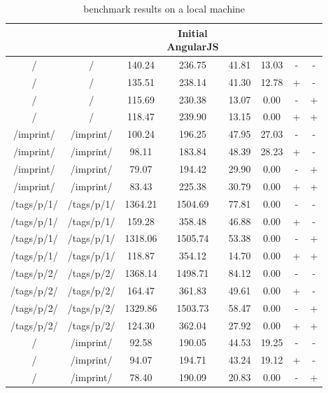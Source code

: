 \begin{appendix}
\subsubsection{\selenium{}}
\begin{center}
\footnotesize
\begin{longtable}{cccccccc}
    \caption{\selenium{} benchmark results on a local machine}
    \\
	\hline
	\thead{From} & \thead{To} & \thead{Common} & \thead{Initial\\AngularJS} & \thead{\lare{}} & \thead{AngularJS} &  \thead{DC} & \thead{TC} \\
\hline
/ & / & 140.24 & 236.75 & 41.81 & 13.03 & - & - \\
/ & / & 135.51 & 238.14 & 41.30 & 12.78 & + & - \\
/ & / & 115.69 & 230.38 & 13.07 & 0.00 & - & + \\
/ & / & 118.47 & 239.90 & 13.15 & 0.00 & + & + \\
\hline
/imprint/ & /imprint/ & 100.24 & 196.25 & 47.95 & 27.03 & - & - \\
/imprint/ & /imprint/ & 98.11 & 183.84 & 48.39 & 28.23 & + & - \\
/imprint/ & /imprint/ & 79.07 & 194.42 & 29.90 & 0.00 & - & + \\
/imprint/ & /imprint/ & 83.43 & 225.38 & 30.79 & 0.00 & + & + \\
\hline
/tags/p/1/ & /tags/p/1/ & 1364.21 & 1504.69 & 77.81 & 0.00 & - & - \\
/tags/p/1/ & /tags/p/1/ & 159.28 & 358.48 & 46.88 & 0.00 & + & - \\
/tags/p/1/ & /tags/p/1/ & 1318.06 & 1505.74 & 53.38 & 0.00 & - & + \\
/tags/p/1/ & /tags/p/1/ & 118.87 & 354.12 & 14.70 & 0.00 & + & + \\
\hline
/tags/p/2/ & /tags/p/2/ & 1368.14 & 1498.71 & 84.12 & 0.00 & - & - \\
/tags/p/2/ & /tags/p/2/ & 164.47 & 361.83 & 49.61 & 0.00 & + & - \\
/tags/p/2/ & /tags/p/2/ & 1329.86 & 1503.73 & 58.47 & 0.00 & - & + \\
/tags/p/2/ & /tags/p/2/ & 124.30 & 362.04 & 27.92 & 0.00 & + & + \\
\hline
\hline
/ & /imprint/ & 92.58 & 190.05 & 44.53 & 19.25 & - & - \\
/ & /imprint/ & 94.07 & 194.71 & 43.24 & 19.12 & + & - \\
/ & /imprint/ & 78.40 & 190.09 & 20.83 & 0.00 & - & + \\

\end{longtable}
\end{center}
\end{appendix}
